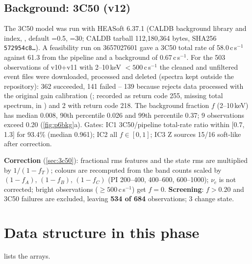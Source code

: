 \subsection{Background: 3C50 (v12)}
The 3C50 model \citep{Remillard2022} was run with HEASoft 6.37.1  (CALDB background library and index, ,
default =0.5, =30; CALDB tarball 112,180,364 bytes, SHA256 \texttt{572954c8\dots}). A feasibility run on 3657027601 gave a
3C50 total rate of 58.0\,c\,s$^{-1}$ against 61.3 from the pipeline and a background of 0.67\,c\,s$^{-1}$. For the 503 observations of v10+v11 with
2--10\,keV $<500$\,c\,s$^{-1}$ the cleaned and unfiltered event files were downloaded, processed and deleted (spectra kept outside the repository):
362 succeeded, 141 failed -- 139 because  rejects data processed with the original gain calibration
(; recorded as return code 255, missing total spectrum, in ) and 2 with return
code 218. The background fraction $f$ (2--10\,keV) has median 0.008, 90th percentile 0.026 and 99th percentile 0.37; 9 observations exceed 0.20
(\cref{fig:p6bkg}a). Gates: IC1 3C50/pipeline total-rate ratio within [0.7, 1.3] for 93.4\% (median 0.961); IC2 all $f\in[0,1]$; IC3 Z sources 15/16
soft-like after correction.

\textbf{Correction} (\cref{sec:3c50}): fractional rms features and the state rms are multiplied by $1/(1-f_T)$; colours are recomputed from the
band counts scaled by $(1-f_A)$, $(1-f_B)$, $(1-f_C)$ (PI 200--400, 400--600, 600--1000); $\nu_c$ is not corrected; bright observations
($\ge500$\,c\,s$^{-1}$) get $f=0$. \textbf{Screening}: $f>0.20$ and 3C50 failures are excluded, leaving \textbf{534 of 684} observations; 3 change state.

\section{Data structure in this phase}\label{sec:p6structure}
 lists the arrays.

